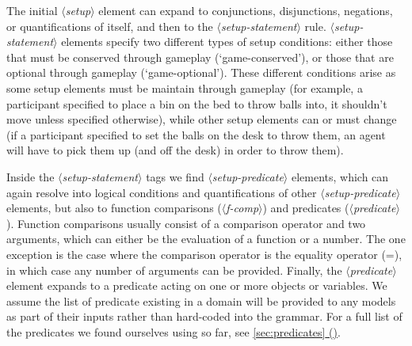 \documentclass{article}
\newcommand{\dsl}[1]{{\it $\langle$#1$\rangle$}}
\newcommand*{\fullref}[1]{\hyperref[{#1}]{\autoref*{#1} (\nameref*{#1})}} %
\begin{document}
The initial \dsl{setup} element can expand to conjunctions, disjunctions, negations, or quantifications of itself, and then to the \dsl{setup-statement} rule.
\dsl{setup-statement} elements specify two different types of setup conditions: either those that must be conserved through gameplay (`game-conserved'), or those that are optional through gameplay (`game-optional').
These different conditions arise as some setup elements must be maintain through gameplay (for example, a participant specified to place a bin on the bed to throw balls into, it shouldn't move unless specified otherwise), while other setup elements can or must change (if a participant specified to set the balls on the desk to throw them, an agent will have to pick them up (and off the desk) in order to throw them). 

Inside the \dsl{setup-statement} tags we find \dsl{setup-predicate} elements, which can again resolve into logical conditions and quantifications of other \dsl{setup-predicate} elements, but also to function comparisons (\dsl{f-comp}) and predicates (\dsl{predicate}). 
Function comparisons usually consist of a comparison operator and two arguments, which can either be the evaluation of a function or a number. 
The one exception is the case where the comparison operator is the equality operator (=), in which case any number of arguments can be provided. 
Finally, the \dsl{predicate} element expands to a predicate acting on one or more objects or variables. 
We assume the list of predicate existing in a domain will be provided to any models as part of their inputs rather than hard-coded into the grammar.
For a full list of the predicates we found ourselves using so far, see \fullref{sec:predicates}.
        
\end{document}
